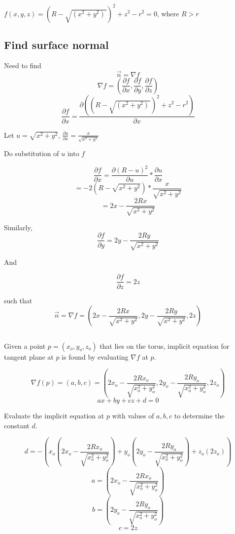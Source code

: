 \documentclass[a4paper,10pt]{scrartcl}
\begin{document}
$f(x,y,z) = (R - \sqrt{(x^2 + y^2) \,})^2 + z^2 - r^2 = 0$, where $ R > r$

\subsection{Find surface normal}


Need to find \[ \vec n = \nabla f\]
\[ \nabla f = ( \frac{\partial f}{\partial x}, \frac{\partial f}{\partial y}, \frac{\partial f}{\partial z})\]
\[ \frac{\partial f}{\partial x} = \frac{\partial ((R - \sqrt{(x^2 + y^2) \,})^2 + z^2 - r^2)}{\partial x}\]

Let $u = \sqrt{x ^2 + y^2}$, $\frac{\partial u}{\partial x} = \frac{x}{\sqrt{x ^2 + y^2}}$

Do substitution of $u$ into $f$

\[ \frac{\partial f}{\partial x} = \frac{\partial (R - u)^2}{\partial u} * \frac{\partial u}{\partial x}\]
\[ = -2 (R - \sqrt{x^2 + y^2}) * \frac{x}{\sqrt{x^2 + y^2}}\]
\[ = 2x - \frac{2Rx}{\sqrt{x^2+y^2}}\]

Similarly, 
\[\frac{\partial f}{\partial y} = 2y - \frac{2Ry}{\sqrt{x^2+y^2}}\]

And

\[\frac{\partial f}{\partial z} = 2z\]

such that \[ \vec n = \nabla f = (2x - \frac{2Rx}{\sqrt{x^2+y^2}}, 2y - \frac{2Ry}{\sqrt{x^2+y^2}}, 2z)\]

% 
% 

\subsection{}

Given a point $p = (x_o, y_o, z_o)$ that lies on the torus, implicit equation for tangent plane at $p$ is found by evaluating
$\nabla f $ at $p$.

\[ \nabla f(p) = (a,b,c) = (2x_o - \frac{2Rx_o}{\sqrt{x_o^2+y_o^2}}, 2y_o - \frac{2Ry_o}{\sqrt{x_o^2+y_o^2}}, 2z_o) \]
\[ ax + by + cz + d = 0\]

Evaluate the implicit equation at $p$ with values of $a, b, c$ to determine the constant $d$.

\[ d = -( x_o (2x_o - \frac{2Rx_o}{\sqrt{x_o^2+y_o^2}}) + y_o (2y_o - \frac{2Ry_o}{\sqrt{x_o^2+y_o^2}}) + z_o(2 z_o) )\]
\[ a = (2x_o - \frac{2Rx_o}{\sqrt{x_o^2+y_o^2}})\]
\[ b = (2y_o - \frac{2Ry_o}{\sqrt{x_o^2+y_o^2}})\]
\[ c = 2z\]
\end{document}
